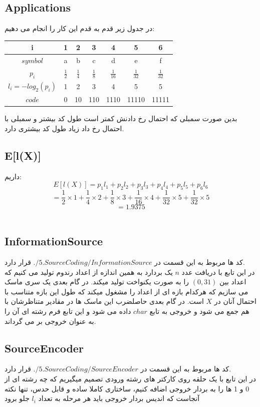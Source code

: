 \documentclass[a4paper,12pt]{article}
\begin{document}
\subsection{Applications}
در جدول زیر قدم به قدم این کار را انجام می دهیم:
\begin{center}
  \begin{tabular}{ c | c | c | c | c | c | c}
    \hline
    i & 1 & 2 & 3 & 4 & 5 & 6 \\ \hline
    $symbol$ & a & b & c & d & e & f \\ \hline
    $p_i$ & $\frac{1}{2}$ & $\frac{1}{4}$ & $\frac{1}{8}$ & $\frac{1}{16}$ & $\frac{1}{32}$ & $\frac{1}{32}$ \\ \hline
    $l_i = -log_2(p_i)$ & 1 & 2 & 3 & 4 & 5 & 5 \\ \hline
    $code$ & 0 & 10 & 110 & 1110 & 11110 & 11111
  \end{tabular}
\end{center}
بدین صورت سمبلی که احتمال رخ دادنش کمتر است طول کد بیشتر و سمبلی با احتمال رخ داد زیاد طول کد بیشتری دارد.
\\
\subsection{E[l(X)]}
داریم:
$$
E[l(X)] = p_1l_1 + p_2l_2 + p_3l_3 + p_4l_4 + p_5l_5 + p_6l_6
$$
$$
= \frac{1}{2}\times 1 + \frac{1}{4}\times 2 + \frac{1}{8}\times 3 + \frac{1}{16}\times 4 + \frac{1}{32}\times 5 + \frac{1}{32}\times 5
$$
$$
= 1.9375
$$
\\
\subsection{InformationSource}
کد ها مربوط به این قسمت در $./5.SourceCoding/InformationSource$ قرار دارد.
\\
در این تابع با دریافت عدد $n$ یک بردارد به همین اندازه از اعداد رندوم تولید می کنیم که اعداد بین $(0,31)$ را به صورت یکنواخت تولید میکند. در گام بعدی یک سری ماسک می سازیم که هرکدام بازه ای از اعداد را مشغول میکند که طول این بازه متناسب با احتمال آنان در $X$ است. در گام بعدی حاصلضرب این ماسک ها در مقادیر متناظرشان با هم جمع می شود و خروجی به تابع $char$ داده می شود و این تابع فرم رشته ای آن را به عنوان خروجی بر می گرداند.
\\
\subsection{SourceEncoder}
کد ها مربوط به این قسمت در $./5.SourceCoding/SourceEncoder$ قرار دارد.
\\
در این تابع با یک حلقه روی کارکتر های رشته ورودی تصمیم میگیریم که چه رشته ای از 0 و 1 ها را به بردار خروجی اضافه کنیم، ساختاری کاملا ساده و قابل حدس، تنها نکته آنجاست که اندیس بردار خروجی باید هر مرحله به تعداد  $l_i$ جلو برود
\\
\end{document}
